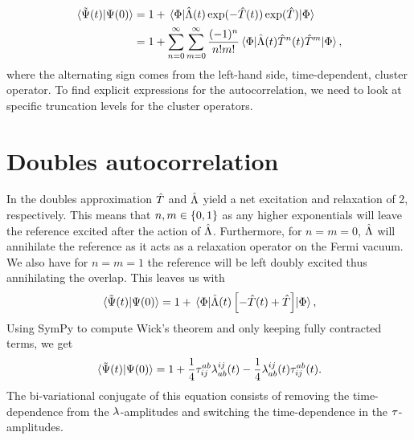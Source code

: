     \begin{align}
        \braket*{\tilde{\Psi}(t)}{\Psi(0)}
        &=
        1
        +
        \mel*{\slat}{
            \clustl(t)
            \exponential(-\clust(t))
            \exponential(\clust)
        }{\slat}
        \\
        &=
        1
        + \sum_{n = 0}^{\infty}\sum_{m = 0}^{\infty}
        \frac{(-1)^{n}}{n!m!}
        \mel*{\slat}{
            \clustl(t)
            \clust^n(t)
            \clust^m
        }{\slat},
        \label{eq:cc-autocorrelation}
    \end{align}
    where the alternating sign comes from the left-hand side, time-dependent,
    cluster operator.
    To find explicit expressions for the autocorrelation, we need to look at
    specific truncation levels for the cluster operators.

    \section{Doubles autocorrelation}
        In the doubles approximation $\hat{T}$ and $\hat{\Lambda}$ yield a net
        excitation and relaxation of 2, respectively.
        This means that $n, m \in \left\{ 0, 1 \right\}$ as any higher exponentials will
        leave the reference excited after the action of $\hat{\Lambda}$.
        Furthermore, for $n = m = 0$, $\hat{\Lambda}$ will annihilate the reference as
        it acts as a relaxation operator on the Fermi vacuum.
        We also have for $n = m = 1$ the reference will be left doubly excited
        thus annihilating the overlap.
        This leaves us with
        \begin{gather}
            \braket*{\tilde{\Psi}(t)}{\Psi(0)}
            = 1
            + \mel*{\Phi}{
                \hat{\Lambda}(t)\left[ 
                    -\hat{T}(t) + \hat{T}
                 \right]
            }{\Phi},
        \end{gather}
        Using SymPy \cite{sympy} to compute Wick's theorem and only keeping
        fully contracted terms, we get
        \begin{gather}
            \braket*{\tilde{\Psi}(t)}{\Psi(0)}
            = 1
            + \frac{1}{4}\tau^{ab}_{ij} \lambda^{ij}_{ab}(t)
            - \frac{1}{4}\lambda^{ij}_{ab}(t) \tau^{ab}_{ij}(t).
        \end{gather}
        The bi-variational conjugate of this equation consists of removing the
        time-dependence from the $\lambda$-amplitudes and switching the
        time-dependence in the $\tau$-amplitudes.

